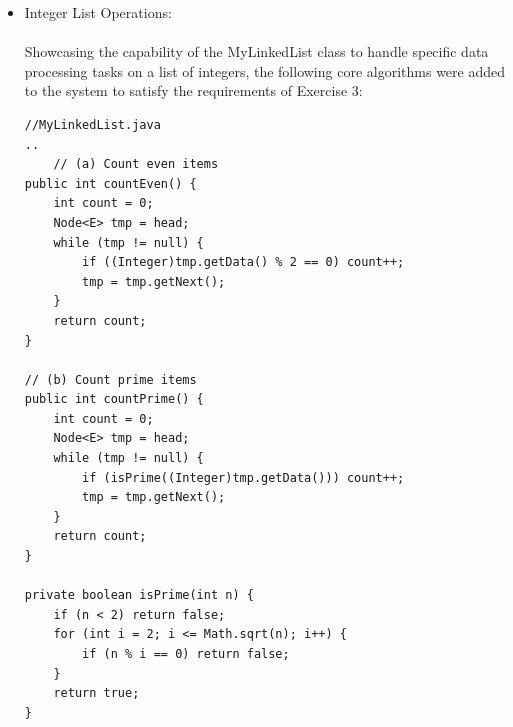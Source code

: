 \documentclass[12pt]{article}
\begin{document}
\begin{itemize}
\begin{verbatim}
    if (prev == null) throw new NoSuchElementException("Node not found");
    
    prev.setNext(curr.getNext());
    numNode--;
    return curr.getData();
    ...
}\end{verbatim}
And calling the method in ListInterface.Java
\begin{verbatim}
    
    \ListInterface.java
    ...
    public E removeCurr(Node<E> curr) throws NoSuchElementException;
    ...
\end{verbatim}
\item[\textbf{Exercise 3. }] Integer List Operations:\\\\
Showcasing the capability of the MyLinkedList class to handle specific data processing tasks on a list of integers, the following core algorithms were added to the system to satisfy the requirements of Exercise 3:

\begin{verbatim}
//MyLinkedList.java
..
    // (a) Count even items
public int countEven() {
    int count = 0;
    Node<E> tmp = head;
    while (tmp != null) {
        if ((Integer)tmp.getData() % 2 == 0) count++;
        tmp = tmp.getNext();
    }
    return count;
}

// (b) Count prime items
public int countPrime() {
    int count = 0;
    Node<E> tmp = head;
    while (tmp != null) {
        if (isPrime((Integer)tmp.getData())) count++;
        tmp = tmp.getNext();
    }
    return count;
}

private boolean isPrime(int n) {
    if (n < 2) return false;
    for (int i = 2; i <= Math.sqrt(n); i++) {
        if (n % i == 0) return false;
    }
    return true;
}


\end{verbatim}
\end{itemize}
\end{document}
